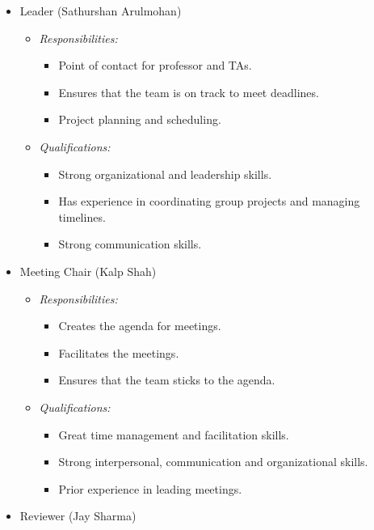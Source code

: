 \documentclass[12pt]{article}
\theoremstyle{definition}
\begin{document}
\begin{itemize}
  \item Leader (Sathurshan Arulmohan)
    \begin{itemize}
      \item \textit{Responsibilities:}
        \begin{itemize}
          \item Point of contact for professor and TAs. 
          \item Ensures that the team is on track to meet deadlines.
          \item Project planning and scheduling.
        \end{itemize}
      \item \textit{Qualifications:}
        \begin{itemize}
          \item Strong organizational and leadership skills. 
          \item Has experience in coordinating group projects and managing
          timelines. 
          \item Strong communication skills. 
        \end{itemize}
    \end{itemize}
  \item Meeting Chair (Kalp Shah)
    \begin{itemize}
      \item \textit{Responsibilities:}
        \begin{itemize}
          \item Creates the agenda for meetings.
          \item Facilitates the meetings.
          \item Ensures that the team sticks to the agenda.
        \end{itemize}
      \item \textit{Qualifications:}
        \begin{itemize}
          \item Great time management and facilitation skills. 
          \item Strong interpersonal, communication and organizational skills. 
          \item Prior experience in leading meetings. 
        \end{itemize}
    \end{itemize}
  \item Reviewer (Jay Sharma)
    \begin{itemize}

\end{itemize}
\end{itemize}
\end{document}
